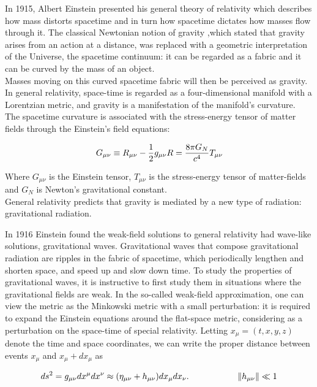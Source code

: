 \documentclass[binding=0.6cm, LaM]{sapthesis}
\begin{document}
	In 1915, Albert Einstein presented his general theory of relativity  which describes 
	how mass distorts spacetime and in turn how spacetime dictates how masses flow through it.
	The classical Newtonian notion of gravity ,which stated that gravity arises from an 
	action at a distance, was replaced with a geometric interpretation of the Universe, 
	the spacetime continuum: it can be regarded as a fabric and it can be curved 
	by the mass of an object. \\
	Masses moving on this curved spacetime fabric will then be perceived as gravity.
	In general relativity, space-time is regarded as a four-dimensional manifold 
	with a Lorentzian metric, and gravity is a manifestation of the manifold’s curvature. \\
	The spacetime curvature is associated with the stress-energy tensor 
	of matter fields through the Einstein’s field equations:

		\begin{equation}
		G_{\mu\nu} \equiv R_{\mu\nu}  - {1 \over 2}g_{\mu\nu}R = {8\pi G_{N} \over {c^4}}T_{\mu\nu} 
		\end{equation}

	Where $G_{\mu\nu} $ is the Einstein tensor, $T_{\mu\nu} $ is the stress-energy 
	tensor of matter-fields and $ G_{N}$ is Newton’s gravitational constant. \\
	General relativity predicts that gravity is mediated by a new type of radiation: gravitational radiation. 

	In 1916 Einstein found the weak-field solutions to general relativity had wave-like solutions, gravitational waves.
	Gravitational waves that compose gravitational radiation are ripples in the fabric of spacetime, 
	which periodically lengthen and shorten space, and speed up and slow down time.
 	To study the properties of gravitational waves, it is instructive to first study them 
	in situations where the gravitational fields are weak.
	In the so-called weak-field approximation, one can view the metric as the Minkowski metric 
	with a small perturbation: it is required to expand the Einstein equations around the flat-space metric,
	considering as a perturbation on the space-time of special relativity.
	Letting $ x_\mu = (t, x, y, z)$ denote the time and space coordinates, 
	we can write the proper distance between events $x_{\mu}$ and $x_{\mu} + dx_{\mu}$ as
		
		\[
		ds^2 = g_{\mu\nu}dx^{\mu}dx^{\nu} \approx (\eta_{\mu\nu} + h_{\mu\nu})dx_{\mu}dx_{\nu}. \hspace*{2cm}\|h_{\mu\nu}\|\ll 1
		\]
\end{document}
